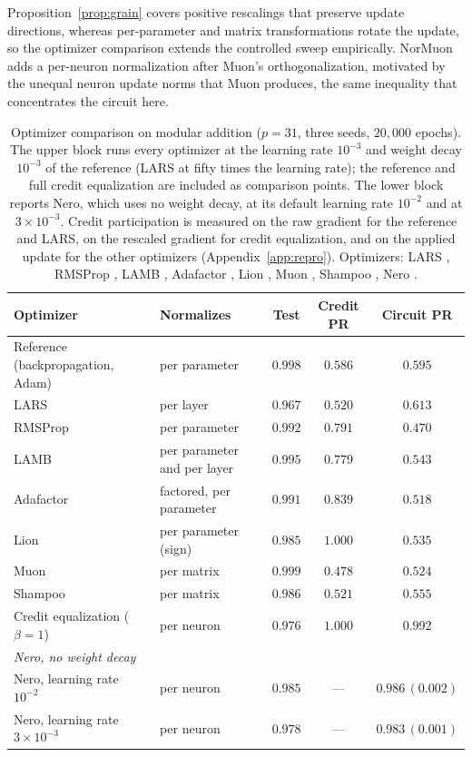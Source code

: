 \documentclass{article} %
\begin{document}
Proposition~\ref{prop:grain} covers positive rescalings that preserve update directions, whereas per-parameter and matrix transformations rotate the update, so the optimizer comparison extends the controlled sweep empirically. NorMuon \citep{li2025normuon} adds a per-neuron normalization after Muon's orthogonalization, motivated by the unequal neuron update norms that Muon produces, the same inequality that concentrates the circuit here.

\begin{table}[!ht]
\caption{Optimizer comparison on modular addition ($p=31$, three seeds, $20{,}000$ epochs). The upper block runs every optimizer at the learning rate $10^{-3}$ and weight decay $10^{-3}$ of the reference (LARS at fifty times the learning rate); the reference and full credit equalization are included as comparison points. The lower block reports Nero, which uses no weight decay, at its default learning rate $10^{-2}$ and at $3\times10^{-3}$. Credit participation is measured on the raw gradient for the reference and LARS, on the rescaled gradient for credit equalization, and on the applied update for the other optimizers (Appendix~\ref{app:repro}). Optimizers: LARS \citep{you2017lars}, RMSProp \citep{tieleman2012rmsprop}, LAMB \citep{you2020lamb}, Adafactor \citep{shazeer2018adafactor}, Lion \citep{chen2023lion}, Muon \citep{jordan2024muon}, Shampoo \citep{gupta2018shampoo}, Nero \citep{liu2021nero}.}
\label{tab:zoo}
\begin{center}
\footnotesize
\setlength{\tabcolsep}{4pt}
\begin{tabular}{llccc}
\toprule
Optimizer & Normalizes & Test & Credit PR & Circuit PR \\
\midrule
Reference (backpropagation, Adam) & per parameter & $0.998$ & $0.586$ & $0.595$ \\
LARS            & per layer     & $0.967$ & $0.520$ & $0.613$ \\
RMSProp         & per parameter & $0.992$ & $0.791$ & $0.470$ \\
LAMB            & per parameter and per layer & $0.995$ & $0.779$ & $0.543$ \\
Adafactor       & factored, per parameter & $0.991$ & $0.839$ & $0.518$ \\
Lion            & per parameter (sign) & $0.985$ & $1.000$ & $0.535$ \\
Muon            & per matrix    & $0.999$ & $0.478$ & $0.524$ \\
Shampoo         & per matrix    & $0.986$ & $0.521$ & $0.555$ \\
Credit equalization ($\beta{=}1$) & per neuron & $0.976$ & $1.000$ & $0.992$ \\
\midrule
\multicolumn{5}{l}{\emph{Nero, no weight decay}} \\
Nero, learning rate $10^{-2}$ & per neuron & $0.985$ & --- & $0.986\,(0.002)$ \\
Nero, learning rate $3\times10^{-3}$ & per neuron & $0.978$ & --- & $0.983\,(0.001)$ \\
\bottomrule
\end{tabular}
\end{center}
\end{table}
\end{document}
